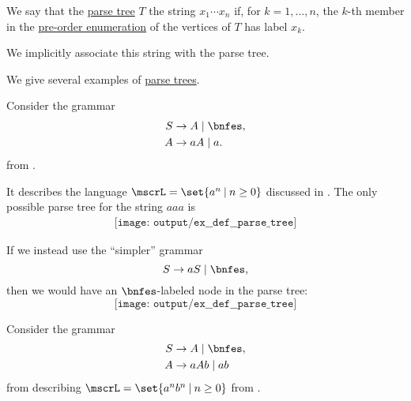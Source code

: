 \begin{definition}\label{def:parse_tree_string}
  We say that the \hyperref[def:parse_tree]{parse tree} \( T \)  the string \( x_1 \cdots x_n \) if, for \( k = 1, \ldots, n \), the \( k \)-th member in the \hyperref[def:ordered_tree_enumeration]{pre-order enumeration} of the vertices of \( T \) has label \( x_k \).
\end{definition}
\begin{comments}
  \item We implicitly associate this string with the parse tree.
\end{comments}

\begin{example}\label{ex:def:parse_tree}
  We give several examples of \hyperref[def:parse_tree]{parse trees}.

  \begin{thmenum}
     Consider the grammar
    \begin{equation*}
      \begin{aligned}
        S &\to A \mid \bnfes, \\
        A &\to aA \mid a.
      \end{aligned}
    \end{equation*}
    from .

    It describes the language \( \mscrL = \set{ a^n \given n \geq 0 } \) discussed in . The only possible parse tree for the string \( aaa \) is
    \begin{equation*}\label{eq:ex:def:parse_tree/an}
      \begin{aligned}
        \texttt{[image: output/ex\_\_def\_\_parse\_tree]}
      \end{aligned}
    \end{equation*}

    If we instead use the \enquote{simpler} grammar
    \begin{equation*}
      S \to aS \mid \bnfes,
    \end{equation*}
    then we would have an \( \bnfes \)-labeled node in the parse tree:
    \begin{equation*}
      \texttt{[image: output/ex\_\_def\_\_parse\_tree]}
    \end{equation*}

     Consider the grammar
    \begin{equation*}
      \begin{aligned}
        S &\to A \mid \bnfes, \\
        A &\to aAb \mid ab
      \end{aligned}
    \end{equation*}
    from  describing \( \mscrL = \set{ a^n b^n \given n \geq 0 } \) from .


\end{thmenum}
\end{example}
